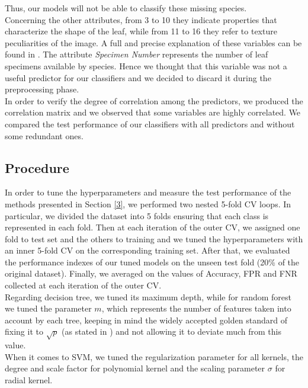 \documentclass{article}
\begin{document}
Thus, our models will not be able to classify these missing species.
\\ Concerning the other attributes, from 3 to 10 they indicate properties that characterize the shape of the leaf, while from 11 to 16 they refer to texture peculiarities of the image. A full and precise explanation of these variables can be found in \cite{silva}. The attribute \textit{Specimen Number} represents the number of leaf specimens available by species. Hence we thought that this variable was not a useful predictor for our classifiers and we decided to discard it during the preprocessing phase.
\\In order to verify the degree of correlation among the predictors, we produced the correlation matrix and we observed that some variables are highly correlated. We compared the test performance of our classifiers with all predictors and without some redundant ones.

\subsection{Procedure}
In order to tune the hyperparameters and measure the test performance of the methods presented in Section \ref{3}, we performed two nested 5-fold CV loops. 
In particular, we divided the dataset into 5 folds ensuring that each class is represented in each fold. Then at each iteration of the outer CV, we assigned one fold to test set and the others to training and we tuned the hyperparameters with an inner 5-fold CV on the corresponding training set. After that, we evaluated the performance indexes of our tuned models on the unseen test fold (20\% of the original dataset). Finally, we averaged on the values of Accuracy, FPR and FNR collected at each iteration of the outer CV.
\\Regarding decision tree, we tuned its maximum depth, while for random forest we tuned the parameter $m$, which represents the number of features taken into account by each tree, keeping in mind the widely accepted golden standard of fixing it to $\sqrt{p}$ (as stated in \cite{book}) and not allowing it to deviate much from this value.
\\When it comes to SVM, we tuned the regularization parameter for all kernels, the degree and scale factor for polynomial kernel and the scaling parameter $\sigma$ for radial kernel.
\end{document}
